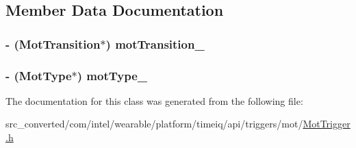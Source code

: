 \subsection{Member Data Documentation}
\hypertarget{interface_mot_trigger___mot_trigger_builder_a1557515af3c9db6a78bdd909a1166473}{}
\subsubsection[{mot\+Transition\+\_\+}]{\setlength{\rightskip}{0pt plus 5cm}-\/ ({\bf Mot\+Transition}$\ast$) mot\+Transition\+\_\+}\label{interface_mot_trigger___mot_trigger_builder_a1557515af3c9db6a78bdd909a1166473}
\hypertarget{interface_mot_trigger___mot_trigger_builder_a4c9134b7a6aac2bd06fb1fe1ecbaeb39}{}
\subsubsection[{mot\+Type\+\_\+}]{\setlength{\rightskip}{0pt plus 5cm}-\/ (Mot\+Type$\ast$) mot\+Type\+\_\+}\label{interface_mot_trigger___mot_trigger_builder_a4c9134b7a6aac2bd06fb1fe1ecbaeb39}


The documentation for this class was generated from the following file\+:\begin{DoxyCompactItemize}
\item 
src\+\_\+converted/com/intel/wearable/platform/timeiq/api/triggers/mot/\hyperlink{_mot_trigger_8h}{Mot\+Trigger.\+h}\end{DoxyCompactItemize}
